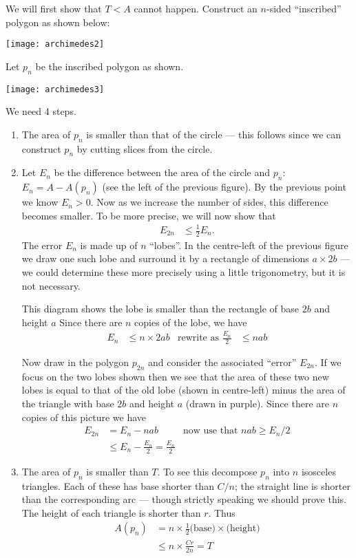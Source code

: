 We will first show that $T<A$ cannot happen. Construct an $n$-sided ``inscribed'' polygon
as shown below:
\begin{center}
 \texttt{[image: archimedes2]}
\end{center}
Let $p_n$ be the inscribed polygon as shown.
\begin{center}
 \texttt{[image: archimedes3]}
\end{center}
We need 4 steps.
\begin{enumerate}
 \item The area of $p_n$ is smaller than that of the circle --- this follows since we can
construct $p_n$ by cutting slices from the circle.
 \item Let $E_n$ be the difference between the area of the circle and $p_n$: $E_n = A -
A(p_n)$ (see the left of the previous figure). By the previous point we know $E_n>0$.
Now as we increase the number of sides, this difference becomes smaller. To be more
precise, we will now show that
  \begin{align*}
  E_{2n} & \leq \frac{1}{2} E_n.
  \end{align*}
The error $E_n$ is made up of $n$ ``lobes''. In the centre-left of the previous figure we
draw one such lobe and surround it by a rectangle of dimensions $a \times 2b$ --- we
could determine these more precisely using a little trigonometry, but it is not necessary.

This diagram shows the lobe is smaller than the rectangle of base $2b$ and height $a$
Since there are $n$ copies of the lobe, we have
\begin{align*}
  E_n & \leq n  \times 2ab & \text{rewrite as } \frac{E_n}{2} & \leq nab
\end{align*}

Now draw in the polygon $p_{2n}$ and consider the associated ``error'' $E_{2n}$. If we
focus on the two lobes shown then we see that the area of these two new lobes is equal to
that of the old lobe (shown in centre-left) minus the area of the triangle with base $2b$
and height $a$ (drawn in purple). Since there are $n$ copies of this
picture we have
\begin{align*}
  E_{2n} &= E_n - nab & \text{now use that $nab \geq  E_n/2$} \\
  & \leq E_n - \frac{E_n}{2} = \frac{E_n}{2}
\end{align*}

\item The area of $p_n$ is smaller than $T$. To see this decompose $p_n$ into $n$
isosceles triangles. Each of these has base shorter than $C/n$; the straight line is
shorter than the corresponding arc --- though strictly speaking we should prove this. The
height of each triangle is shorter than $r$. Thus
\begin{align*}
  A(p_n) &= n \times \frac{1}{2} \text{(base)}\times \text{(height)} \\
  & \leq n \times \frac{Cr}{2n} = T
\end{align*}


\end{enumerate}
